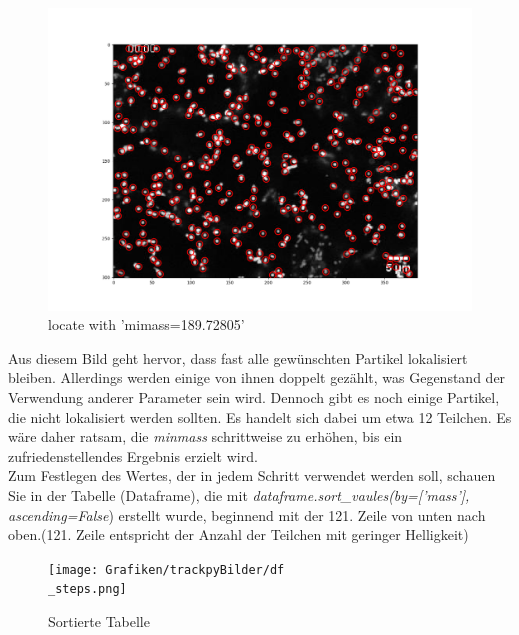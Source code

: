 \begin{enumerate}
\begin{figure}[H]
    \centering
    \includegraphics[scale=0.35]{Grafiken/trackpyBilder/locate_with_minmass_01.png}
    \caption{locate with 'mimass=189.72805'}
\end{figure}

Aus diesem Bild geht hervor, dass fast alle gewünschten Partikel lokalisiert bleiben. Allerdings werden einige von ihnen doppelt gezählt, was Gegenstand der Verwendung anderer Parameter sein wird. Dennoch gibt es noch einige Partikel, die nicht lokalisiert werden sollten. Es handelt sich dabei um etwa 12 Teilchen. Es wäre daher ratsam, die \textit{minmass} schrittweise zu erhöhen, bis ein zufriedenstellendes Ergebnis erzielt wird.\\
Zum Festlegen des Wertes, der in jedem Schritt verwendet werden soll, schauen Sie in der Tabelle (Dataframe), die mit \textit{dataframe.sort\_vaules(by=['mass'], ascending=False}) erstellt wurde, beginnend mit der 121. Zeile von unten nach oben.(121. Zeile entspricht der Anzahl der Teilchen mit geringer Helligkeit)

\begin{figure}[H]
    \centering
    \texttt{[image: Grafiken/trackpyBilder/df\\\_steps.png]}
    \caption{Sortierte Tabelle}
\end{figure}


\end{enumerate}
